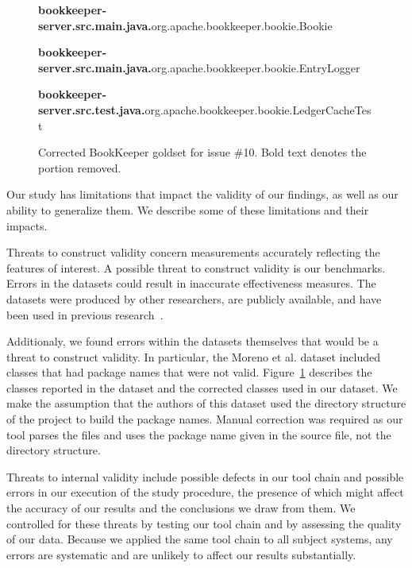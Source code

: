 

\begin{figure}[t]
\footnotesize

{\bf bookkeeper-server.src.main.java.}org.apache.bookkeeper.bookie.Bookie

{\bf bookkeeper-server.src.main.java.}org.apache.bookkeeper.bookie.EntryLogger

{\bf bookkeeper-server.src.test.java.}org.apache.bookkeeper.bookie.LedgerCacheTest

\caption{Corrected BookKeeper goldset for issue \#10. Bold text denotes the portion removed.}
\label{fig:goldsetfix}
\vspace{-10pt}
\end{figure}


Our study has limitations that impact the validity of our findings,
as well as our ability to generalize them.
We describe some of these limitations and their impacts.

Threats to construct validity concern measurements accurately reflecting the features of interest.
A possible threat to construct validity is our benchmarks.
Errors in the datasets could result in inaccurate effectiveness measures.
The datasets were produced by other researchers, are publicly available,
and have been used in previous research~\cite{dit2013feature, Revelle-etal:2010, Moreno:2014}.

Additionaly, we found errors within the datasets themselves that would be a threat to construct validity.
In particular, the Moreno et al. dataset included classes that had package names that were not valid.
Figure~\ref{fig:goldsetfix} describes the classes reported in the dataset and the corrected classes used in our dataset.
We make the assumption that the authors of this dataset used the directory structure of the project to build the package names.
Manual correction was required as our tool parses the files and uses the package name given in the source file, not the directory structure.

Threats to internal validity include possible defects in our tool chain and possible errors
in our execution of the study procedure,
the presence of which might affect the accuracy of our results and the conclusions we draw from them.
We controlled for these threats by testing our tool chain and by assessing the quality of our data.
Because we applied the same tool chain to all subject systems, any errors are systematic and are unlikely
to affect our results substantially.

